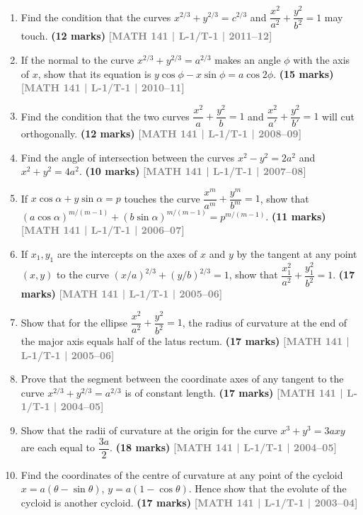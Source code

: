 \documentclass[12pt,a4paper]{article}
\newcommand{\yr}[1]{\hfill\textcolor{gray}{\small\textbf{[#1]}}}
\newcommand{\mk}[1]{\textcolor{orange!70!black}{\small\textbf{(#1 marks)}}}
\begin{document}
\begin{enumerate}
\item Find the condition that the curves $x^{2/3}+y^{2/3}=c^{2/3}$ and $\dfrac{x^{2}}{a^{2}}+\dfrac{y^{2}}{b^{2}}=1$ may touch.
\mk{12} \yr{MATH 141 | L-1/T-1 | 2011--12}

\item If the normal to the curve $x^{2/3}+y^{2/3}=a^{2/3}$ makes an angle $\phi$ with the axis of $x$, show that its equation is $y\cos\phi-x\sin\phi=a\cos 2\phi$.
\mk{15} \yr{MATH 141 | L-1/T-1 | 2010--11}

\item Find the condition that the two curves $\dfrac{x^{2}}{a}+\dfrac{y^{2}}{b}=1$ and $\dfrac{x^{2}}{a'}+\dfrac{y^{2}}{b'}=1$ will cut orthogonally.
\mk{12} \yr{MATH 141 | L-1/T-1 | 2008--09}

\item Find the angle of intersection between the curves $x^{2}-y^{2}=2a^{2}$ and $x^{2}+y^{2}=4a^{2}$.
\mk{10} \yr{MATH 141 | L-1/T-1 | 2007--08}

\item If $x\cos\alpha+y\sin\alpha=p$ touches the curve $\dfrac{x^{m}}{a^{m}}+\dfrac{y^{m}}{b^{m}}=1$, show that $(a\cos\alpha)^{m/(m-1)}+(b\sin\alpha)^{m/(m-1)}=p^{m/(m-1)}$.
\mk{11} \yr{MATH 141 | L-1/T-1 | 2006--07}

\item If $x_{1},y_{1}$ are the intercepts on the axes of $x$ and $y$ by the tangent at any point $(x,y)$ to the curve $(x/a)^{2/3}+(y/b)^{2/3}=1$, show that $\dfrac{x_{1}^{2}}{a^{2}}+\dfrac{y_{1}^{2}}{b^{2}}=1$.
\mk{17} \yr{MATH 141 | L-1/T-1 | 2005--06}

\item Show that for the ellipse $\dfrac{x^{2}}{a^{2}}+\dfrac{y^{2}}{b^{2}}=1$, the radius of curvature at the end of the major axis equals half of the latus rectum.
\mk{17} \yr{MATH 141 | L-1/T-1 | 2005--06}

\item Prove that the segment between the coordinate axes of any tangent to the curve $x^{2/3}+y^{2/3}=a^{2/3}$ is of constant length.
\mk{17} \yr{MATH 141 | L-1/T-1 | 2004--05}

\item Show that the radii of curvature at the origin for the curve $x^{3}+y^{3}=3axy$ are each equal to $\dfrac{3a}{2}$.
\mk{18} \yr{MATH 141 | L-1/T-1 | 2004--05}

\item Find the coordinates of the centre of curvature at any point of the cycloid $x=a(\theta-\sin\theta)$, $y=a(1-\cos\theta)$. Hence show that the evolute of the cycloid is another cycloid.
\mk{17} \yr{MATH 141 | L-1/T-1 | 2003--04}


\end{enumerate}
\end{document}

